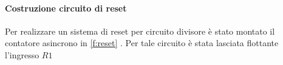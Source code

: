 	\paragraph{Costruzione circuito di reset}
	Per realizzare un sistema di reset per circuito divisore
	è stato montato il contatore asincrono in \figurename{  \ref{f:reset} }.
	Per tale circuito è stata lasciata flottante l'ingresso $R1$
